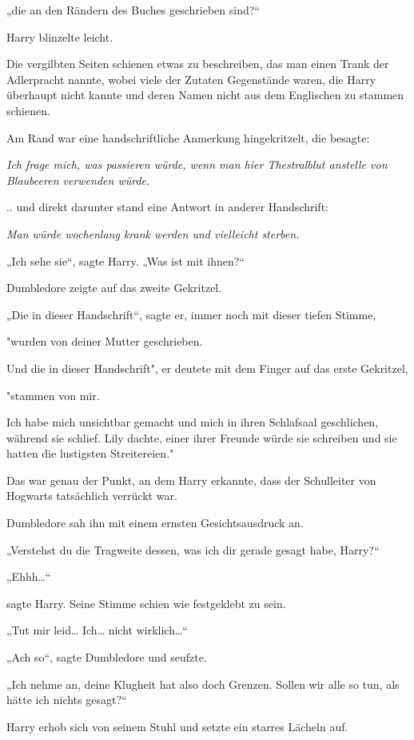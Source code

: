 {„die an den Rändern des Buches geschrieben sind?“

Harry blinzelte leicht.

Die vergilbten Seiten schienen etwas zu beschreiben, das man einen Trank der Adlerpracht nannte, wobei viele der Zutaten Gegenstände waren, die Harry überhaupt nicht kannte und deren Namen nicht aus dem Englischen zu stammen schienen.

Am Rand war eine handschriftliche Anmerkung hingekritzelt, die besagte:

\emph{Ich frage mich, was passieren würde, wenn man hier Thestralblut anstelle von Blaubeeren verwenden würde.}

.. und direkt darunter stand eine Antwort in anderer Handschrift:

\emph{Man würde wochenlang krank werden und vielleicht sterben.}

„Ich sehe sie“, sagte Harry. „Was ist mit ihnen?“

Dumbledore zeigte auf das zweite Gekritzel.

„Die in dieser Handschrift“, sagte er, immer noch mit dieser tiefen Stimme,

"wurden von deiner Mutter geschrieben.

Und die in dieser Handschrift", er deutete mit dem Finger auf das erste Gekritzel,

"stammen von mir.

Ich habe mich unsichtbar gemacht und mich in ihren Schlafsaal geschlichen, während sie schlief. Lily dachte, einer ihrer Freunde würde sie schreiben und sie hatten die lustigsten Streitereien."

Das war genau der Punkt, an dem Harry erkannte, dass der Schulleiter von Hogwarts tatsächlich verrückt war.

Dumbledore sah ihn mit einem ernsten Gesichtsausdruck an.

„Verstehst du die Tragweite dessen, was ich dir gerade gesagt habe, Harry?“

„Ehhh…“

sagte Harry. Seine Stimme schien wie festgeklebt zu sein.

„Tut mir leid… Ich… nicht wirklich…“

„Ach so“, sagte Dumbledore und seufzte.

„Ich nehme an, deine Klugheit hat also doch Grenzen. Sollen wir alle so tun, als hätte ich nichts gesagt?“

Harry erhob sich von seinem Stuhl und setzte ein starres Lächeln auf.

}
